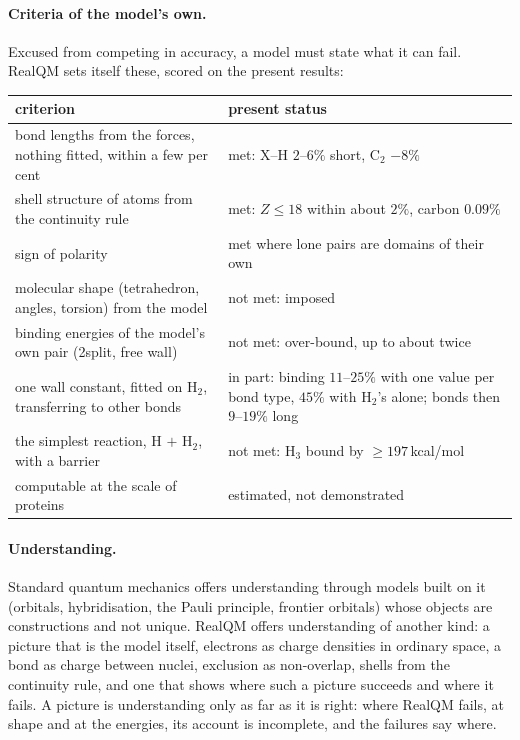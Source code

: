 \documentclass[11pt]{article}
\begin{document}
\paragraph{Criteria of the model's own.} Excused from competing in accuracy, a model must state what it can fail. RealQM
sets itself these, scored on the present results:
\begin{center}
\small
\begin{tabular}{p{}p{}}
\toprule
criterion & present status \\
\midrule
bond lengths from the forces, nothing fitted, within a few per cent & met: X--H $2$--$6\%$ short, C$_2$ $-8\%$ \\
shell structure of atoms from the continuity rule & met: $Z \le 18$ within about $2\%$, carbon $0.09\%$ \\
sign of polarity & met where lone pairs are domains of their own \\
molecular shape (tetrahedron, angles, torsion) from the model & not met: imposed \\
binding energies of the model's own pair (2split, free wall) & not met: over-bound, up to about twice \\
one wall constant, fitted on H$_2$, transferring to other bonds & in part: binding $11$--$25\%$ with one value per
  bond type, $45\%$ with H$_2$'s alone; bonds then $9$--$19\%$ long \\
the simplest reaction, H $+$ H$_2$, with a barrier & not met: H$_3$ bound by $\ge 197$\,kcal/mol \\
computable at the scale of proteins & estimated, not demonstrated \\
\bottomrule
\end{tabular}
\end{center}

\paragraph{Understanding.} Standard quantum mechanics offers understanding through models built on it (orbitals,
hybridisation, the Pauli principle, frontier orbitals) whose objects are constructions and not unique. RealQM offers
understanding of another kind: a picture that is the model itself, electrons as charge densities in ordinary space,
a bond as charge between nuclei, exclusion as non-overlap, shells from the continuity rule, and one that shows where
such a picture succeeds and where it fails. A picture is understanding only as far as it is right: where RealQM
fails, at shape and at the energies, its account is incomplete, and the failures say where.
\end{document}
